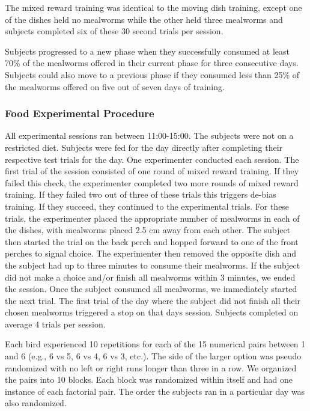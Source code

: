 \documentclass[
]{article}
\begin{document}
The mixed reward training was identical to the moving dish training,
except one of the dishes held no mealworms while the other held three
mealworms and subjects completed six of these 30 second trials per
session.

Subjects progressed to a new phase when they successfully consumed at
least 70\% of the mealworms offered in their current phase for three
consecutive days. Subjects could also move to a previous phase if they
consumed less than 25\% of the mealworms offered on five out of seven
days of training.

\hypertarget{food-experimental-procedure}{%
\subsubsection{Food Experimental
Procedure}\label{food-experimental-procedure}}

All experimental sessions ran between 11:00-15:00. The subjects were not
on a restricted diet. Subjects were fed for the day directly after
completing their respective test trials for the day. One experimenter
conducted each session. The first trial of the session consisted of one
round of mixed reward training. If they failed this check, the
experimenter completed two more rounds of mixed reward training. If they
failed two out of three of these trials this triggers de-bias training.
If they succeed, they continued to the experimental trials. For these
trials, the experimenter placed the appropriate number of mealworms in
each of the dishes, with mealworms placed 2.5 cm away from each other.
The subject then started the trial on the back perch and hopped forward
to one of the front perches to signal choice. The experimenter then
removed the opposite dish and the subject had up to three minutes to
consume their mealworms. If the subject did not make a choice and/or
finish all mealworms within 3 minutes, we ended the session. Once the
subject consumed all mealworms, we immediately started the next trial.
The first trial of the day where the subject did not finish all their
chosen mealworms triggered a stop on that days session. Subjects
completed on average 4 trials per session.

Each bird experienced 10 repetitions for each of the 15 numerical pairs
between 1 and 6 (e.g., 6 vs 5, 6 vs 4, 6 vs 3, etc.). The side of the
larger option was pseudo randomized with no left or right runs longer
than three in a row. We organized the pairs into 10 blocks. Each block
was randomized within itself and had one instance of each factorial
pair. The order the subjects ran in a particular day was also
randomized.
\end{document}
